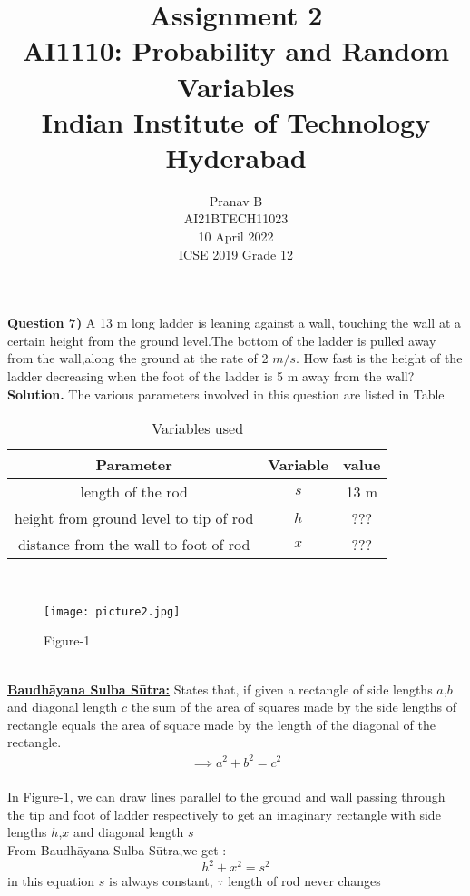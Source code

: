 \documentclass[journal,12pt,twocolumn]{IEEEtran}
\title{Assignment 2 \\ \Large AI1110: Probability and Random Variables \\ \large Indian Institute of Technology Hyderabad}
\author{Pranav B \\ \normalsize AI21BTECH11023 \\ \vspace*{20pt} \normalsize  10 April 2022 \\ \vspace*{20pt} \Large ICSE 2019 Grade 12}
\begin{document}
	\maketitle
	
	\textbf{Question 7)} 
	A 13 m long ladder is leaning against a wall, touching the wall at a certain height from the ground level.The bottom of the ladder is pulled away from the wall,along the ground at the rate of 2 $m/s$. How fast is the height of the ladder decreasing when the foot of the ladder is 5 m away from the wall?\\
	\textbf{Solution.}
	The various parameters involved in this question are listed in Table \begin{table}[h]
\caption{Variables used}
\begin{tabular}{|c|c|c|}
\hline
Parameter & Variable & value\\
\hline
length of the rod & $s$ & 13 m\\
\hline
height from ground level to tip of rod & $h$ & ???\\
\hline
distance from the wall to foot of rod & $x$ &???\\
\hline
\end{tabular}
\end{table}
\\
\begin{figure}[h]
\texttt{[image: picture2.jpg]}
\caption{Figure-1}
\end{figure}
\\
\underline{\textbf{Baudhāyana Sulba Sūtra:}}
States that, if given a rectangle of side lengths $a$,$b$ and diagonal length $c$ the sum of the area of squares made by the side lengths of rectangle equals the area of square made by the length of the diagonal of the rectangle.\\
\begin{align}
\implies a^2+b^2=c^2
\end{align}
\\
In Figure-1, we can draw lines parallel to the ground and wall passing through the tip and foot of ladder respectively to get an imaginary rectangle with side lengths $h$,$x$ and diagonal length $s$\\
From Baudhāyana Sulba Sūtra,we get :
\begin{equation}
h^2+x^2=s^2
\end{equation}
in this equation $s$ is always constant,
 $\because$ length of rod never changes\\
\end{document}
